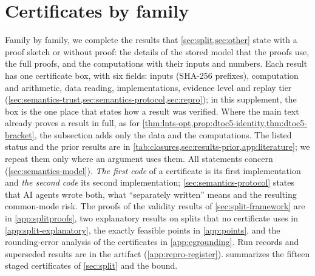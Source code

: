 \section{Certificates by family}\label{app:families}

Family by family, we complete the results that \cref{sec:split,sec:other} state with a proof sketch or without proof: the details of the stored model that the proofs use, the full proofs, and the computations with their inputs and numbers.
Each result has one certificate box, with six fields: inputs (SHA-256 prefixes), computation and arithmetic, data reading, implementations, evidence level and replay tier (\cref{sec:semantics-trust,sec:semantics-protocol,sec:repro}); in this supplement, the box is the one place that states how a result was verified.
Where the main text already proves a result in full, as for \cref{thm:lnts-opt,prop:dtoc5-identity,thm:dtoc5-bracket}, the subsection adds only the data and the computations.
The listed status and the prior results are in \cref{tab:closures,sec:results-prior,app:literature}; we repeat them only where an argument uses them.
All statements concern  (\cref{sec:semantics-model}).
\emph{The first code} of a certificate is its first implementation and \emph{the second code} its second implementation; \cref{sec:semantics-protocol} states that AI agents wrote both, what ``separately written'' means and the resulting common-mode risk.
The proofs of the validity results of \cref{sec:split-framework} are in \cref{app:splitproofs}, two explanatory results on splits that no certificate uses in \cref{app:split-explanatory}, the exactly feasible points in \cref{app:points}, and the rounding-error analysis of the  certificates in \cref{app:egrounding}.
Run records and superseded results are in the artifact (\cref{app:repro-register}).
 summarizes the fifteen staged certificates of \cref{sec:split} and the  bound.


